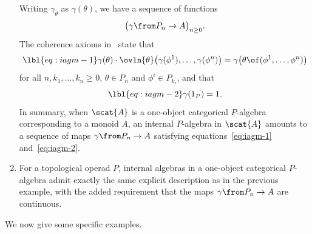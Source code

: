 \begin{examples}
\begin{enumerate}
Writing $\gamma_\theta$ as $\gamma(\theta)$, we have a sequence of
functions
\[
\bigl( \gamma \from P_n \to A \bigr)_{n \geq 0}.
\]
The coherence axioms in~ state that 
% 
\begin{equation}
\lbl{eq:iagm-1}
\gamma(\theta) \cdot 
\ovln{\theta}\bigl(\gamma(\phi^1), \ldots, \gamma(\phi^n)\bigr)
=
\gamma\bigl(\theta \of (\phi^1, \ldots, \phi^n)\bigr)
\end{equation}
% 
for all $n, k_1, \ldots, k_n \geq 0$, $\theta \in P_n$ and $\phi^i \in
P_{k_i}$, and that
% 
\begin{equation}
\lbl{eq:iagm-2}
\gamma(1_P) = 1.
\end{equation}
% 
In summary, when $\scat{A}$ is a one-object categorical $P$-algebra
corresponding to a monoid $A$, an internal $P$-algebra in $\scat{A}$
amounts to a sequence of maps $\gamma \from P_n \to A$ satisfying
equations~\eqref{eq:iagm-1} and~\eqref{eq:iagm-2}.

\item
{}
For a topological operad $P$, internal algebras in a one-object categorical
$P$-algebra admit exactly the same explicit description as in the previous
example, with the added requirement that the maps $\gamma \from P_n \to A$
are continuous.
\end{enumerate}
\end{examples}

We now give some specific examples.

